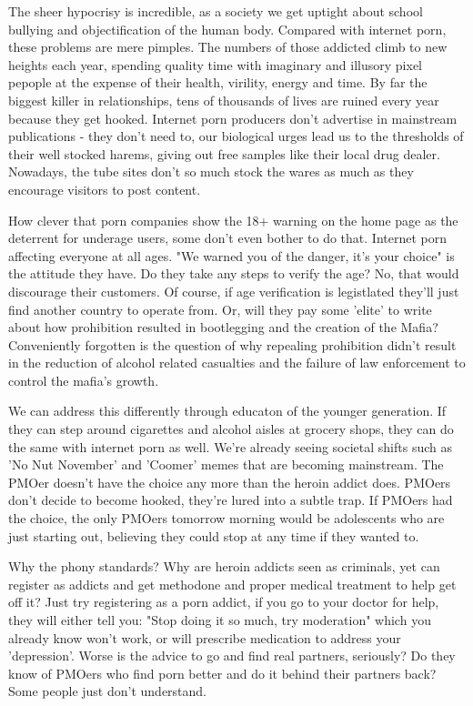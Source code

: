 The sheer hypocrisy is incredible, as a society we get uptight about school bullying and objectification of the human body. Compared with internet porn, these problems are mere pimples. The numbers of those addicted climb to new heights each year, spending quality time with imaginary and illusory pixel pepople at the expense of their health, virility, energy and time. By far the biggest killer in relationships, tens of thousands of lives are ruined every year because they get hooked. Internet porn producers don't advertise in mainstream publications - they don't need to, our biological urges lead us to the thresholds of their well stocked harems, giving out free samples like their local drug dealer. Nowadays, the tube sites don't so much stock the wares as much as they encourage visitors to post content.

How clever that porn companies show the 18+ warning on the home page as the deterrent for underage users, some don't even bother to do that. Internet porn affecting everyone at all ages. "We warned you of the danger, it's your choice" is the attitude they have. Do they take any steps to verify the age? No, that would discourage their customers. Of course, if age verification is legistlated they'll just find another country to operate from. Or, will they pay some 'elite' to write about how prohibition resulted in bootlegging and the creation of the Mafia? Conveniently forgotten is the question of why repealing prohibition didn't result in the reduction of alcohol related casualties and the failure of law enforcement to control the mafia's growth.

We can address this differently through educaton of the younger generation. If they can step around cigarettes and alcohol aisles at grocery shops, they can do the same with internet porn as well. We're already seeing societal shifts such as 'No Nut November' and 'Coomer' memes that are becoming mainstream. The PMOer doesn't have the choice any more than the heroin addict does. PMOers don't decide to become hooked, they're lured into a subtle trap. If PMOers had the choice, the only PMOers tomorrow morning would be adolescents who are just starting out, believing they could stop at any time if they wanted to.

Why the phony standards? Why are heroin addicts seen as criminals, yet can register as addicts and get methodone and proper medical treatment to help get off it? Just try registering as a porn addict, if you go to your doctor for help, they will either tell you: "Stop doing it so much, try moderation" which you already know won't work, or will prescribe medication to address your 'depression'. Worse is the advice to go and find real partners, seriously? Do they know of PMOers who find porn better and do it behind their partners back? Some people just don't understand.

